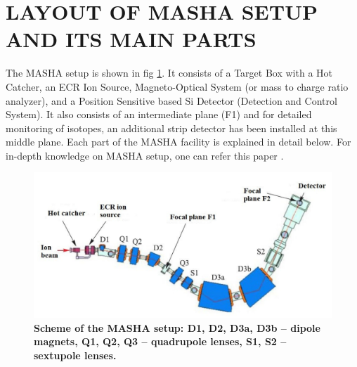 \documentclass[12pt]{article}
\begin{document}
\section{LAYOUT OF MASHA SETUP AND ITS MAIN PARTS}
The MASHA setup is shown in fig \ref{Scheme of the MASHA setup: D1, D2, D3a, D3b – dipole magnets, Q1, Q2, Q3 – quadrupole lenses, S1, S2 – sextupole lenses.}. It consists of a Target Box with a Hot Catcher, an ECR Ion Source, Magneto-Optical System (or mass to charge ratio analyzer), and a Position Sensitive based Si Detector (Detection and Control System). It also consists of an intermediate plane (F1) and for detailed monitoring of isotopes, an additional strip detector has been installed at this middle plane. Each part of the MASHA facility is explained in detail below. For in-depth knowledge on MASHA setup, one can refer this paper \cite{vedeneev2017current}.

\begin{figure}[h]
\centering
\includegraphics[scale=0.6]{MASHA.png}
\caption{\textbf{Scheme of the MASHA setup: D1, D2, D3a, D3b – dipole magnets, Q1, Q2, Q3 – quadrupole lenses, S1, S2 – sextupole lenses.}}
\label{Scheme of the MASHA setup: D1, D2, D3a, D3b – dipole magnets, Q1, Q2, Q3 – quadrupole lenses, S1, S2 – sextupole lenses.}
\end{figure}
\end{document}
